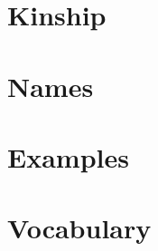 \documentclass[12pt,letterpaper,openany,twoside]{memoir}
\begin{document}
\chapter{Kinship}
%

\chapter{Names}
%

\chapter{Examples}
%

\chapter{Vocabulary}
%


\backmatter


\printbibliography


\printindex
\end{document}
